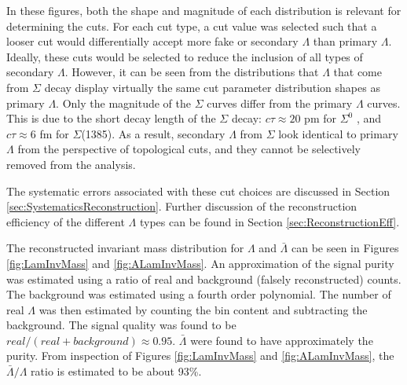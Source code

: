 In these figures, both the shape and magnitude of each distribution is relevant for determining the cuts. 
For each cut type, a cut value was selected such that a looser cut would differentially accept more fake or secondary $\Lambda$ than primary $\Lambda$. 
Ideally, these cuts would be selected to reduce the inclusion of all types of secondary $\Lambda$.  
However, it can be seen from the distributions that $\Lambda$ that come from $\Sigma$ decay display virtually the same cut parameter distribution shapes as primary $\Lambda$.  
Only the magnitude of the $\Sigma$ curves differ from the primary $\Lambda$ curves.  
This is due to the short decay length of the $\Sigma$ decay: $c\tau \approx 20$ pm for $\Sigma^0$ , and $c\tau \approx 6$ fm for $\Sigma$(1385). 
As a result, secondary $\Lambda$ from $\Sigma$ look identical to primary $\Lambda$ from the perspective of topological cuts, and they cannot be selectively removed from the analysis.

The systematic errors associated with these cut choices are discussed in Section \ref{sec:SystematicsReconstruction}. 
Further discussion of the reconstruction efficiency of the different $\Lambda$ types can be found in Section \ref{sec:ReconstructionEff}.

The reconstructed invariant mass distribution for $\Lambda$ and $\bar{\Lambda}$ can be seen in Figures \ref{fig:LamInvMass} and \ref{fig:ALamInvMass}. 
An approximation of the signal purity was estimated using a ratio of real and background (falsely reconstructed) counts.  
The background was estimated using a fourth order polynomial.  
The number of real $\Lambda$ was then estimated by counting the bin content and subtracting the background. 
The signal quality was found to be $real/(real + background) \approx 0.95$.  $\bar{\Lambda}$ were found to have approximately the purity.  
From inspection of Figures \ref{fig:LamInvMass} and \ref{fig:ALamInvMass}, the $\bar{\Lambda}/\Lambda$ ratio is estimated to be about 93\%.

